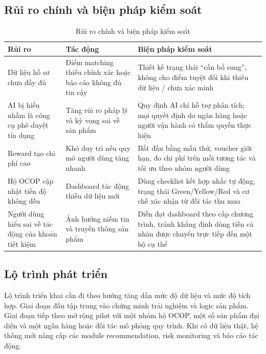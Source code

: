 \documentclass[13pt,a4paper]{extarticle}
\begin{document}
\subsection{Rủi ro chính và biện pháp kiểm soát}

\begin{table}[H]
\centering
\caption{Rủi ro chính và biện pháp kiểm soát}
\begin{tabular}{|p{4cm}|p{4cm}|p{6cm}|}
\hline
\textbf{Rủi ro} & \textbf{Tác động} & \textbf{Biện pháp kiểm soát} \\
\hline
Dữ liệu hồ sơ chưa đầy đủ & Điểm matching thiếu chính xác hoặc báo cáo không đủ tin cậy & Thiết kế trạng thái ``cần bổ sung'', không cho điểm tuyệt đối khi thiếu dữ liệu / chưa xác minh \\
\hline
AI bị hiểu nhầm là công cụ phê duyệt tín dụng & Tăng rủi ro pháp lý và kỳ vọng sai về sản phẩm & Quy định AI chỉ hỗ trợ phân tích; mọi quyết định do ngân hàng hoặc người vận hành có thẩm quyền thực hiện \\
\hline
Reward tạo chi phí cao & Khó duy trì nếu quy mô người dùng tăng nhanh & Bắt đầu bằng mẫu thử, voucher giới hạn, đo chi phí trên mỗi tương tác và tối ưu theo nhóm người dùng \\
\hline
Hộ OCOP cập nhật tiến độ không đều & Dashboard tác động thiếu dữ liệu mới & Dùng checklist kết hợp nhắc tự động, trạng thái Green/Yellow/Red và cơ chế xác nhận từ đối tác thu mua \\
\hline
Người dùng hiểu sai về tác động của khoản tiết kiệm & Ảnh hưởng niềm tin và truyền thông sản phẩm & Diễn đạt dashboard theo cấp chương trình, tránh khẳng định dòng tiền cá nhân được chuyển trực tiếp đến một hộ cụ thể \\
\hline
\end{tabular}
\end{table}

\subsection{Lộ trình phát triển}

Lộ trình triển khai cần đi theo hướng tăng dần mức độ dữ liệu và mức độ tích hợp. Giai đoạn đầu tập trung vào chứng minh trải nghiệm và logic sản phẩm. Giai đoạn tiếp theo mở rộng pilot với một nhóm hộ OCOP, một số sản phẩm đại diện và một ngân hàng hoặc đối tác mô phỏng quy trình. Khi có dữ liệu thật, hệ thống mới nâng cấp các module recommendation, risk monitoring và báo cáo tác động.
\end{document}
